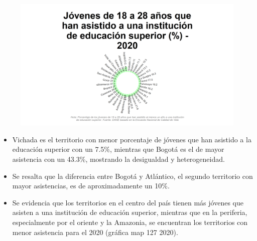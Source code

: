     \begin{figure}[H]
        \caption[Jóvenes de 18 a 28 años que han asistido a una institución de educación superior por departamentos para 2020 ]{\label{asist_edusup_dpto_static} }
        \begin{center}
        \includegraphics[width=\textwidth,keepaspectratio]{img/var_127_static.png}
        \end{center}
    \end{figure}
            \begin{itemize}
                \item Vichada es el territorio con menor porcentaje de jóvenes que han asistido a la educación superior con un 7.5\%, mientras que Bogotá es el de mayor asistencia con un 43.3\%, mostrando la desigualdad y heterogeneidad.
                \item Se resalta que la diferencia entre Bogotá y Atlántico, el segundo territorio con mayor asistencias, es de aproximadamente un 10\%.
                \item Se evidencia que los territorios en el centro del país tienen más jóvenes que asisten a una institución de educación superior, mientras que en la periferia, especialmente por el oriente y la Amazonia, se encuentran los territorios con menor asistencia para el 2020 (gráfica map 127 2020).
                \end{itemize}

